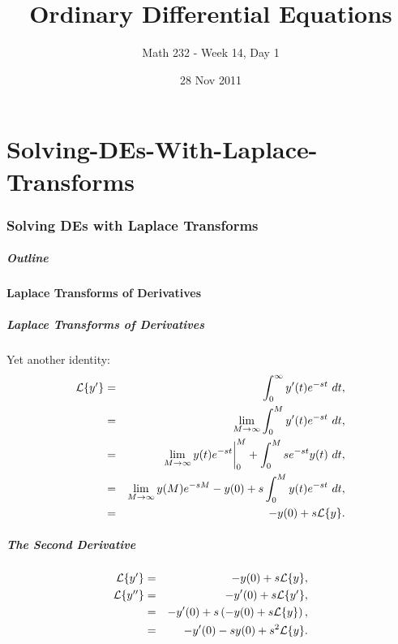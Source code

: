 

\part{Solving-DEs-With-Laplace-Transforms}
\section{Solving DEs with Laplace Transforms}

\title{Ordinary Differential Equations}
\subtitle{Math 232 - Week 14, Day 1}
\date{28 Nov 2011}

\begin{frame}
  \titlepage
\end{frame}

\begin{frame}
  \frametitle{Outline}
\end{frame}


\subsection{Laplace Transforms of Derivatives}


\begin{frame}
  \frametitle{Laplace Transforms of Derivatives}

  Yet another identity:
  \begin{eqnarray*}
    \laplace{y'} & = & \int^\infty_0 y'(t) e^{-st} ~ dt, \\
    & = & \lim_{M\rightarrow\infty} \int^M_0 y'(t) e^{-st} ~ dt, \\
    & = & \lim_{M\rightarrow\infty} y(t)e^{-st} \bigg|^M_0 + \int^M_0 s e^{-st} y(t)~dt, \\
    & = & \lim_{M\rightarrow\infty} y(M)e^{-sM} - y(0) + s \int^M_0 y(t) e^{-st} ~dt, \\
    & = & -y(0) + s \laplace{y}.
  \end{eqnarray*}

\end{frame}


\begin{frame}
  \frametitle{The Second Derivative}

  \begin{eqnarray*}
    \laplace{y'} & = & -y(0) + s \laplace{y}, \\
    \laplace{y''} & = & -y'(0) + s \laplace{y'}, \\
    & = & -y'(0) + s \lp -y(0) + s \laplace{y} \rp, \\
    & = & -y'(0) - s y(0) + s^2 \laplace{y}.
  \end{eqnarray*}

\end{frame}

